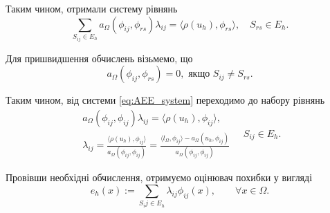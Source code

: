 Таким чином, отримали систему рівнянь
%
\begin{equation}\label{eq:AEE_system}
	\sum \limits_{S_{ij} \in E_h} a_\Omega(\phi_{ij}, \phi_{rs}) \lambda_{ij} = \langle \rho(u_h), \phi_{rs} \rangle, \quad S_{rs} \in E_h.
\end{equation}

Для пришвидшення обчислень візьмемо, що
%
\begin{equation}
	a_\Omega(\phi_{ij}, \phi_{rs}) = 0, \text{ якщо } S_{ij} \ne S_{rs}.
\end{equation}

Таким чином, від системи \eqref{eq:AEE_system} переходимо до набору рівнянь
%
\begin{equation}
	\begin{split}
		a_\Omega(\phi_{ij}, \phi_{ij}) \lambda_{ij} = \langle \rho(u_h), \phi_{ij} \rangle ,\\
		\lambda_{ij} = \frac{\langle \rho(u_h), \phi_{ij} \rangle}{a_\Omega(\phi_{ij}, \phi_{ij})}
			= \frac{\langle l_\Omega, \phi_{ij}\rangle - a_\Omega(u_h, \phi_{ij})}{a_\Omega(\phi_{ij}, \phi_{ij})}
	\end{split}
	\quad S_{ij} \in E_h.
\end{equation}

Провівши необхідні обчислення, отримуємо оцінювач похибки у вигляді
\begin{equation}\label{eq:AEE_final}
	e_h(x) := \sum \limits_{S_ij \in E_h} \lambda_{ij} \phi_{ij}(x), \qquad \forall x \in \Omega.
\end{equation}
